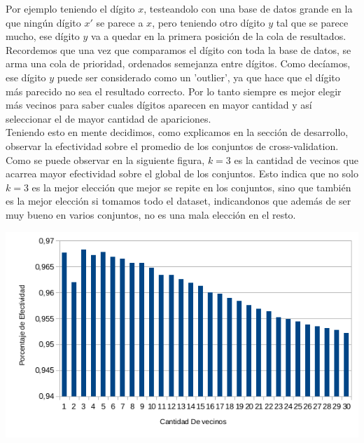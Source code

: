 Por ejemplo teniendo el dígito $x$, testeandolo con una base de datos grande en la que ningún dígito $x'$ se parece a $x$, pero teniendo otro dígito $y$ tal que se parece mucho, ese dígito $y$ va a quedar en la primera posición de la cola de resultados.
Recordemos que una vez que comparamos el dígito con toda la base de datos, se arma una cola de prioridad, ordenados semejanza entre dígitos.
Como decíamos, ese dígito $y$ puede ser considerado como un 'outlier', ya que hace que el dígito más parecido no sea el resultado correcto. Por lo tanto siempre es mejor elegir más vecinos para saber cuales dígitos aparecen en mayor cantidad y así seleccionar el de mayor cantidad de apariciones.
\\
Teniendo esto en mente decidimos, como explicamos en la sección de desarrollo, observar la efectividad sobre el promedio de los conjuntos de cross-validation. Como se puede observar en la siguiente figura, $k=3$ es la cantidad de vecinos que acarrea mayor efectividad sobre el global de los conjuntos. Esto indica que no solo $k=3$ es la mejor elección que mejor se repite en los conjuntos, sino que también es la mejor elección si tomamos todo el dataset, indicandonos que además de ser muy bueno en varios conjuntos, no es una mala elección en el resto.

\begin{center}
\includegraphics[scale=0.6]{nuevosResultados/testeokPCA.png}\\
\end{center}


\\

